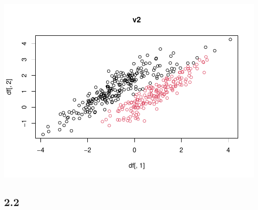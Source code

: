 \documentclass[
  11pt,
]{article}
\begin{document}
\includegraphics{final_GCM_files/figure-latex/unnamed-chunk-4-1.pdf}

\hypertarget{section-7}{%
\subsection{2.2}\label{section-7}}
\end{document}
